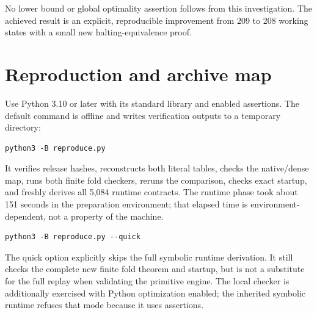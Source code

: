 \documentclass[11pt,letterpaper]{article}
\begin{document}
No lower bound or global optimality assertion follows from this investigation.
The achieved result is an explicit, reproducible improvement from 209 to 208
working states with a small new halting-equivalence proof.

\section{Reproduction and archive map}

Use Python 3.10 or later with its standard library and enabled assertions.
The default command is offline and writes verification outputs to a temporary
directory:
\begin{lstlisting}
python3 -B reproduce.py
\end{lstlisting}
It verifies release hashes, reconstructs both literal tables, checks the
native/dense map, runs both finite fold checkers, reruns the comparison,
checks exact startup, and freshly derives all 5,084 runtime contracts.
The runtime phase took about 151 seconds in the preparation environment;
that elapsed time is environment-dependent, not a property of the machine.

\begin{lstlisting}
python3 -B reproduce.py --quick
\end{lstlisting}
The quick option explicitly skips the full symbolic runtime derivation.
It still checks the complete new finite fold theorem and startup, but is
not a substitute for the full replay when validating the primitive engine.
The local checker is additionally exercised with Python optimization enabled;
the inherited symbolic runtime refuses that mode because it uses assertions.
\end{document}
